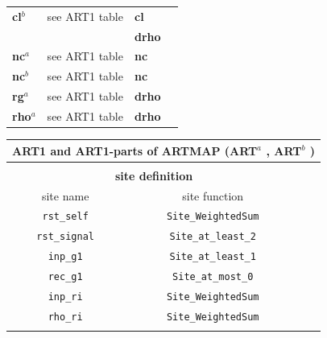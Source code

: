 {\begin{tabular}{|l|c|l|l|l||l|l|}
\hline
%
{\bf cl}$^b$  & \multicolumn{4}{|c||}{see ART1 table} &  {\bf cl} & \\ 
& \multicolumn{4}{|c||}{} & {\bf drho} & \\ 
\hline
%
{\bf nc}$^a$  & \multicolumn{4}{|c||}{see ART1 table} &  {\bf nc} & \\ 
\hline
%
{\bf nc}$^b$  & \multicolumn{4}{|c||}{see ART1 table} &  {\bf nc} & \\ 
\hline
%
{\bf rg}$^a$  & \multicolumn{4}{|c||}{see ART1 table} &  {\bf drho} & \\ 
\hline
%
{\bf rho}$^a$ & \multicolumn{4}{|c||}{see ART1 table} &  {\bf drho} & \\ 
\hline
%
\end{tabular}
}

{\newpage
\clearpage
\samepage \begin{tabular}{|l|c|l|l|l||l|l|}
\hline
%
\multicolumn{7}{|c|}{{\bf ART1 and ART1-parts of ARTMAP (ART$^a$ , ART$^b$ )}} \\ 
\hline
\multicolumn{7}{l}{\vspace{5mm}} \\ 
\hline
%
\multicolumn{5}{|c||}{{\bf site definition}} & \multicolumn{2}{l|}{} \\ 
\cline{1-5}
%
\multicolumn{3}{|c|}{site name} & \multicolumn{2}{c||}{site function}
      & \multicolumn{2}{l|}{} \\ 
\cline{1-5}
%
\multicolumn{3}{|c|}{{\tt rst\_self}}
      & \multicolumn{2}{c||}{{\tt Site\_WeightedSum}}
      & \multicolumn{2}{l|}{} \\ 
\cline{1-5}
%
\multicolumn{3}{|c|}{{\tt rst\_signal}}
      & \multicolumn{2}{c||}{{\tt Site\_at\_least\_2}}
      & \multicolumn{2}{l|}{} \\ 
\cline{1-5}
%
\multicolumn{3}{|c|}{{\tt inp\_g1}}
      & \multicolumn{2}{c||}{{\tt Site\_at\_least\_1}}
      & \multicolumn{2}{l|}{} \\ 
\cline{1-5}
%
\multicolumn{3}{|c|}{{\tt rec\_g1}}
      & \multicolumn{2}{c||}{{\tt Site\_at\_most\_0}}
      & \multicolumn{2}{l|}{} \\ 
\cline{1-5}
%
\multicolumn{3}{|c|}{{\tt inp\_ri}}
      & \multicolumn{2}{c||}{{\tt Site\_WeightedSum}}
      & \multicolumn{2}{l|}{} \\ 
\cline{1-5}
%
\multicolumn{3}{|c|}{{\tt rho\_ri}}
      & \multicolumn{2}{c||}{{\tt Site\_WeightedSum}}
      & \multicolumn{2}{l|}{} \\ 
\cline{1-7}
%
\hline
\multicolumn{7}{l}{\vspace{5mm}} \\ 
\hline
%


\end{tabular}}
